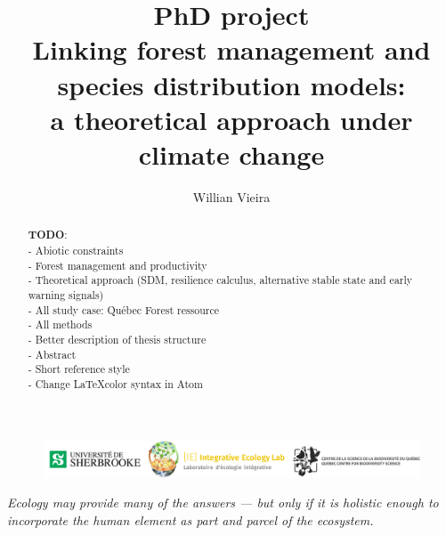 


\title{
  PhD project \\
  \bigskip
  Linking forest management and species distribution models: \\
  a theoretical approach under climate change
}

\author[1,*]{Willian Vieira}
\date{}



\maketitle

\begin{abstract}

\textbf{TODO}: \\
- Abiotic constraints \\
- Forest management and productivity \\
- Theoretical approach (SDM, resilience calculus, alternative stable state and early warning signals) \\
- All study case: Québec Forest ressource \\
- All methods \\
- Better description of thesis structure \\
- Abstract \\
- Short reference style \\
- Change \LaTeX color syntax in Atom

\end{abstract}

\vfill
\begin{figure}
\centering\includegraphics[width=16cm]{img/logo.pdf}
\end{figure}
\thispagestyle{empty} %
\clearpage

\thispagestyle{empty}
\tableofcontents
\clearpage


\begin{displayquote}
\centering\textit{Ecology may provide many of the answers — but only if it is holistic enough to incorporate the human element as part and parcel of the ecosystem.} \\ 
\end{displayquote}


